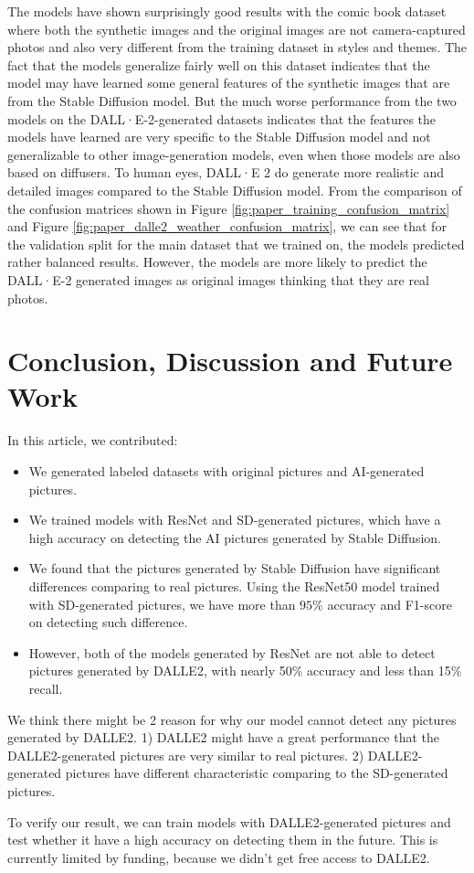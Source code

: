 \documentclass[11pt]{article}
\begin{document}
The models have shown surprisingly good results with the comic book dataset where both the synthetic images and the original images are not camera-captured photos and also very different from the training dataset in styles and themes. The fact that the models generalize fairly well on this dataset indicates that the model may have learned some general features of the synthetic images that are from the Stable Diffusion model. But the much worse performance from the two models on the DALL·E-2-generated datasets indicates that the features the models have learned are very specific to the Stable Diffusion model and not generalizable to other image-generation models, even when those models are also based on diffusers. To human eyes, DALL·E 2 do generate more realistic and detailed images compared to the Stable Diffusion model. From the comparison of the confusion matrices shown in Figure \ref{fig:paper_training_confusion_matrix} and Figure \ref{fig:paper_dalle2_weather_confusion_matrix}, we can see that for the validation split for the main dataset that we trained on, the models predicted rather balanced results. However, the models are more likely to predict the DALL·E-2 generated images as original images thinking that they are real photos.

\section{Conclusion, Discussion and Future Work}

In this article, we contributed:

\begin{itemize}
  \item We generated labeled datasets with original pictures and AI-generated pictures.
  \item We trained models with ResNet and SD-generated pictures, which have a high accuracy on detecting the AI pictures generated by Stable Diffusion.
  \item We found that the pictures generated by Stable Diffusion have significant differences comparing to real pictures. Using the ResNet50 model trained with SD-generated pictures, we have more than $95\%$ accuracy and F1-score on detecting such difference.
  \item However, both of the models generated by ResNet are not able to detect pictures generated by DALLE2, with nearly 50\% accuracy and less than 15\% recall.
\end{itemize}

We think there might be 2 reason for why our model cannot detect any pictures generated by DALLE2. 1) DALLE2 might have a great performance that the DALLE2-generated pictures are very similar to real pictures. 2) DALLE2-generated pictures have different characteristic comparing to the SD-generated pictures.

To verify our result, we can train models with DALLE2-generated pictures and test whether it have a high accuracy on detecting them in the future. This is currently limited by funding, because we didn't get free access to DALLE2.



\end{document}
